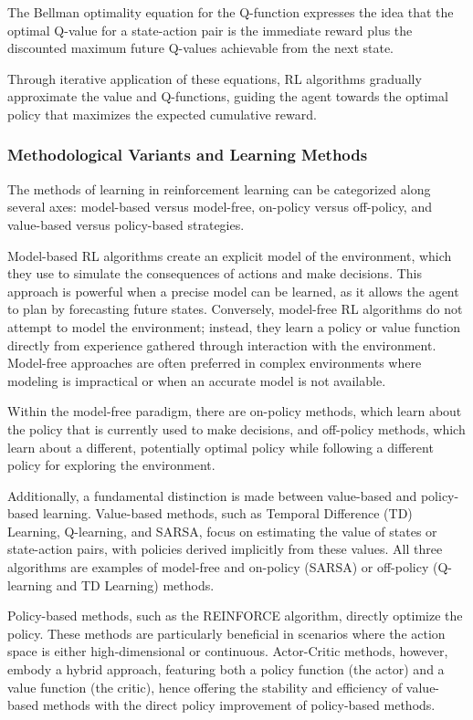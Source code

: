 The Bellman optimality equation for the Q-function expresses the idea that the optimal Q-value for a state-action pair is the immediate reward plus the discounted maximum future Q-values achievable from the next state.

Through iterative application of these equations, RL algorithms gradually approximate the value and Q-functions, guiding the agent towards the optimal policy that maximizes the expected cumulative reward.

\subsubsection{Methodological Variants and Learning Methods}

The methods of learning in reinforcement learning can be categorized along several axes: model-based versus model-free, on-policy versus off-policy, and value-based versus policy-based strategies.

Model-based RL algorithms create an explicit model of the environment, which they use to simulate the consequences of actions and make decisions. This approach is powerful when a precise model can be learned, as it allows the agent to plan by forecasting future states. Conversely, model-free RL algorithms do not attempt to model the environment; instead, they learn a policy or value function directly from experience gathered through interaction with the environment. Model-free approaches are often preferred in complex environments where modeling is impractical or when an accurate model is not available.

Within the model-free paradigm, there are on-policy methods, which learn about the policy that is currently used to make decisions, and off-policy methods, which learn about a different, potentially optimal policy while following a different policy for exploring the environment.

Additionally, a fundamental distinction is made between value-based and policy-based learning. Value-based methods, such as Temporal Difference (TD) Learning, Q-learning, and SARSA, focus on estimating the value of states or state-action pairs, with policies derived implicitly from these values. All three algorithms are examples of model-free and on-policy (SARSA) or off-policy (Q-learning and TD Learning) methods.

Policy-based methods, such as the REINFORCE algorithm, directly optimize the policy. These methods are particularly beneficial in scenarios where the action space is either high-dimensional or continuous. Actor-Critic methods, however, embody a hybrid approach, featuring both a policy function (the actor) and a value function (the critic), hence offering the stability and efficiency of value-based methods with the direct policy improvement of policy-based methods.


